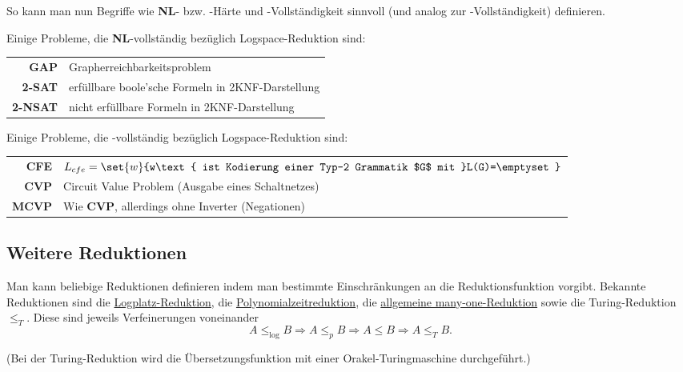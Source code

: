 So kann man nun Begriffe wie \textbf{NL}- bzw. \poly-Härte und -Vollständigkeit sinnvoll (und analog zur \npoly-Vollständigkeit) definieren.

Einige Probleme, die \textbf{NL}-vollständig bezüglich Logspace-Reduktion sind:
\begin{center}
	\begin{tabular}{r|l}
		\textbf{GAP} & Grapherreichbarkeitsproblem\\
		\textbf{2-SAT} & erfüllbare boole'sche Formeln in 2KNF-Darstellung\\
		\textbf{2-NSAT} & nicht erfüllbare Formeln in 2KNF-Darstellung
	\end{tabular}
\end{center}

Einige Probleme, die \poly-vollständig bezüglich Logspace-Reduktion sind:
\begin{center}
	\begin{tabular}{r|l}
		\textbf{CFE} & $L_{cfe}=\set{w}{w\text{ ist Kodierung einer Typ-2 Grammatik $G$ mit }L(G)=\emptyset}$\\
		\textbf{CVP} & Circuit Value Problem (Ausgabe eines Schaltnetzes)\\
		\textbf{MCVP} & Wie \textbf{CVP}, allerdings ohne Inverter (Negationen)
	\end{tabular}
\end{center}

\subsection{Weitere Reduktionen}
Man kann beliebige Reduktionen definieren indem man bestimmte Einschränkungen an die Reduktionsfunktion vorgibt.
Bekannte Reduktionen sind die \hyperref[subsec:logspace]{Logplatz-Reduktion}, die \hyperref[sec:polyred]{Polynomialzeitreduktion}, die \hyperref[sec:reduktion]{allgemeine many-one-Reduktion} sowie die Turing-Reduktion $\leq_T$. Diese sind jeweils Verfeinerungen voneinander 
\begin{equation*}
	A\leq_{\log}B\Rightarrow A\leq_p B\Rightarrow A\leq B\Rightarrow A\leq_T B.
\end{equation*}

(Bei der Turing-Reduktion wird die Übersetzungsfunktion mit einer Orakel-Turingmaschine durchgeführt.)


